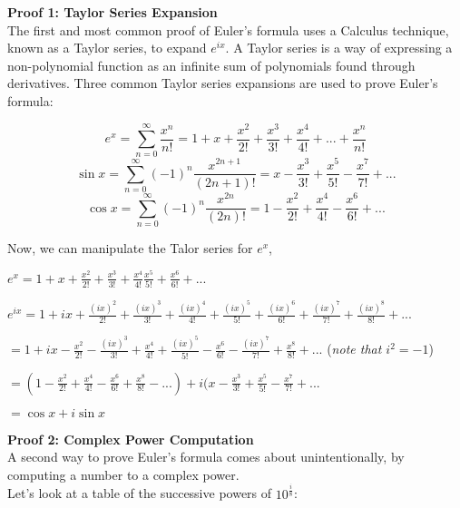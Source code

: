 \documentclass{article}
\theoremstyle{definition}
\begin{document}
\vspace{5mm} %
\noindent
\textbf{Proof 1: Taylor Series Expansion}
\vspace{5mm} %
\\
\noindent
The first and most common proof of Euler’s formula uses a Calculus technique, known as a Taylor series, to expand $e^{ix}$. A Taylor series is a way of expressing a non-polynomial function as an infinite sum of polynomials found through derivatives. Three common Taylor series expansions are used to prove Euler’s formula:
\begin{center}
$$e^{x}=\sum_{n=0}^{\infty} \frac{x^{n}}{n!}  = 1 + x+ \frac{x^2}{2!} + \frac{x^3}{3!} + \frac{x^4}{4!} + ... + \frac{x^n}{n!}$$
$$\sin x=\sum_{n=0}^{\infty} (-1)^n \frac{x^{2n+1}}{(2n+1)!}  = x - \frac{x^3}{3!} + \frac{x^5}{5!} - \frac{x^7}{7!} + ...$$
$$\cos x=\sum_{n=0}^{\infty} (-1)^n \frac{x^{2n}}{(2n)!}  = 1 - \frac{x^2}{2!} + \frac{x^4}{4!} - \frac{x^6}{6!} + ...$$
\end{center}


\noindent
Now, we can manipulate the Talor series for $e^x$,
\begin{center}
$e^x=1+x+\frac{x^2}{2!}+\frac{x^3}{3!}+\frac{x^4}{4!}\frac{x^5}{5!}+\frac{x^6}{6!}+...$

$e^{ix}=1+ix+\frac{(ix)^2}{2!}+\frac{(ix)^3}{3!}+\frac{(ix)^4}{4!}+\frac{(ix)^5}{5!}+\frac{(ix)^6}{6!}
+\frac{(ix)^7}{7!}+\frac{(ix)^8}{8!}+...$

$=1+ix-\frac{x^2}{2!}-\frac{(ix)^3}{3!}+\frac{x^4}{4!}+\frac{(ix)^5}{5!}-\frac{x^6}{6!}-\frac{(ix)^7}{7!}+\frac{x^8}{8!}+...$ (\textit{note that $i^2=-1$})

$=(1-\frac{x^2}{2!}+\frac{x^4}{4!}-\frac{x^6}{6!}+\frac{x^8}{8!}-...)+i(x-\frac{x^3}{3!}+\frac{x^5}{5!}-\frac{x^7}{7!}+...$

$=\cos x + i\sin x$
\end{center}

\noindent
\textbf{Proof 2: Complex Power Computation}
\vspace{5mm} %
\\
\noindent
A second way to prove Euler’s formula comes about unintentionally, by computing a number to a complex power.
\vspace{5mm} %
\\
\noindent
Let’s look at a table of the successive powers of $10^{\frac{i}{8}}$:

\end{document}
